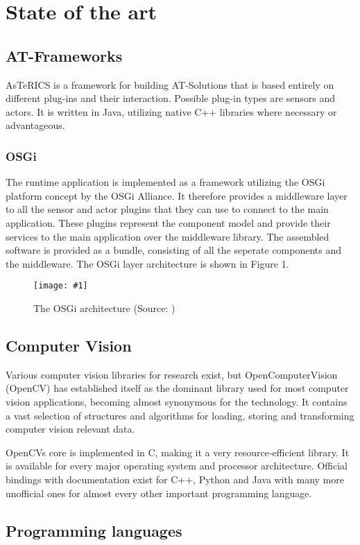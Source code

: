 \documentclass[BSA,Bachelor,english]{twbook}%
\newcommand{\imgsrc}[1]{ (Source: \cite{#1})}
\newcommand{\stdgraphic}[3]{\begin{figure}[h]\caption{#2\imgsrc{#3}}\centering\texttt{[image: \#1]}\end{figure}}
\begin{document}
\section{State of the art}
\subsection{AT-Frameworks}
AsTeRICS is a framework for building AT-Solutions that is based entirely on different plug-ins and their interaction. Possible plug-in types are sensors and actors. It is written in Java, utilizing native C++ libraries where necessary or advantageous.

\subsubsection{OSGi}
The runtime application is implemented as a framework utilizing the OSGi platform concept by the OSGi Alliance. It therefore provides a middleware layer to all the sensor and actor plugins that they can use to connect to the main application. These plugins represent the component model and provide their services to the main application over the middleware library. The assembled software is provided as a bundle, consisting of all the seperate components and the middleware. The OSGi layer architecture is shown in Figure 1.

\stdgraphic{img/layering-osgi.png}{The OSGi architecture}{IMGOSGI}

\newpage
\subsection{Computer Vision}

Various computer vision libraries for research exist, but OpenComputerVision (OpenCV) has established itself as the dominant library used for most computer vision applications, becoming almost synonymous for the technology. It contains a vast selection of structures and algorithms for loading, storing and transforming computer vision relevant data.

OpenCVs core is implemented in C, making it a very resource-efficient library. It is available for every major operating system and processor architecture. Official bindings with documentation exist for C++, Python and Java with many more unofficial ones for almost every other important programming language.

\subsection{Programming languages}
\end{document}
